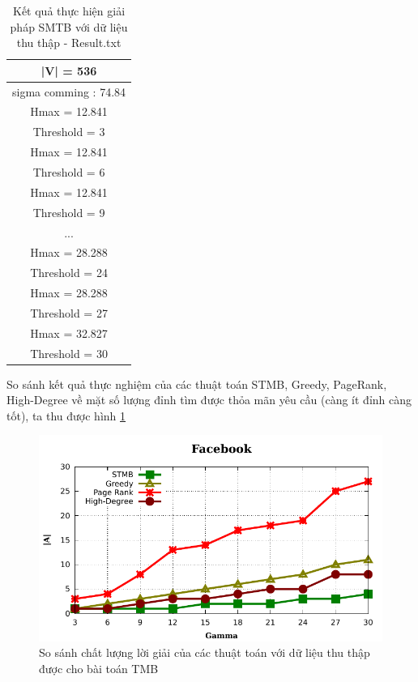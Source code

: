 \begin{itemize}
	\begin{table} [!htp]
		\centering
		\begin{tabular}{|c|}
			\hline
			|V| = 536\\
			\hline
			sigma comming : 74.84\\
			\hline
			Hmax = 12.841\\
			\hline
			Threshold = 3\\
			\hline
			Hmax = 12.841\\
			\hline
			Threshold = 6\\
			\hline
			Hmax = 12.841\\
			\hline
			Threshold = 9\\
			\hline
			...\\
			\hline
			Hmax = 28.288\\
			\hline
			Threshold = 24\\
			\hline
			Hmax = 28.288\\
			\hline
			Threshold = 27\\
			\hline
			Hmax = 32.827\\
			\hline
			Threshold = 30\\
			\hline 
		\end{tabular}
		\caption{Kết quả thực hiện giải pháp SMTB với dữ liệu thu thập - Result.txt}
		\label{bang4_7} 
	\end{table}
	So sánh kết quả thực nghiệm của các thuật toán STMB, Greedy, PageRank, High-Degree về mặt số lượng đỉnh tìm được thỏa mãn yêu cầu (càng ít đỉnh càng tốt), ta thu được hình \ref{realData_TMB}
	\begin{center}
		\begin{figure}[H]
			\begin{center}
				\includegraphics [scale=1]{picture/Facebook}
			\end{center}
			\caption{So sánh chất lượng lời giải của các thuật toán với dữ liệu thu thập được cho bài toán TMB}
			\label{realData_TMB}
		\end{figure}
	\end{center}


\end{itemize}
